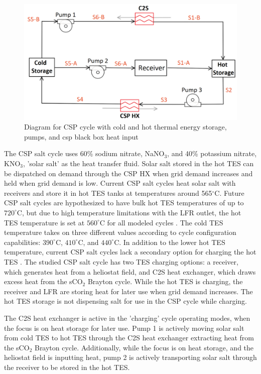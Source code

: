 \begin{paracol}{2}
\begin{figure}[h] 
    \widefigure
    \includegraphics[width=10 cm]{Definitions/csp.pdf}
    \caption{Diagram for CSP cycle with cold and hot thermal energy storage, pumps, and csp black box heat input\label{csp}}
\end{figure}

The CSP salt cycle uses 60\% sodium nitrate, NaNO$_3$, and 40\% potassium nitrate, KNO$_3$, 'solar salt' as the heat transfer fluid. Solar salt stored in the hot TES can be dispatched on demand through the CSP HX when grid demand increases and held when grid demand is low. Current CSP salt cycles heat solar salt with receivers and store it in hot TES tanks at temperatures around 565$^{\circ}$C. Future CSP salt cycles are hypothesized to have bulk hot TES temperatures of up to $720^{\circ}$C, but due to high temperature limitations with the LFR outlet, the hot TES temperature is set at $560^{\circ}$C for all modeled cycles \cite{mehos2017concentrating}. The cold TES temperature takes on three different values according to cycle configuration capabilities: $390^{\circ}$C, $410^{\circ}$C, and $440^{\circ}$C. In addition to the lower hot TES temperature, current CSP salt cycles lack a secondary option for charging the hot TES \cite{hamilton2020dispatch}. The studied CSP salt cycle has two TES charging options: a receiver, which generates heat from a heliostat field, and C2S heat exchanger, which draws excess heat from the sCO$_2$ Brayton cycle. While the hot TES is charging, the receiver and LFR are storing heat for later use when grid demand increases. The hot TES storage is not dispensing salt for use in the CSP cycle while charging.

The C2S heat exchanger is active in the 'charging' cycle operating modes, when the focus is on heat storage for later use. Pump 1 is actively moving solar salt from cold TES to hot TES through the C2S heat exchanger extracting heat from the sCO$_2$ Brayton cycle. Additionally, while the focus is on heat storage, and the heliostat field is inputting heat, pump 2 is actively transporting solar salt through the receiver to be stored in the hot TES.


\end{paracol}
